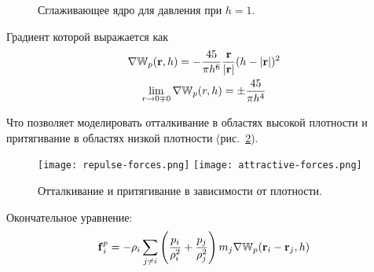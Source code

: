 \begin{figure}
  \centering
  \resizebox{.5\textwidth}{!} {
  }%
  \resizebox{.5\textwidth}{!} {
  }
  \caption{Сглаживающее ядро для давления при $h=1$.}
  \label{fig:kernel-pressure}
\end{figure}

Градиент которой выражается как
\begin{equation}
  \begin{gathered}
    \nabla\mathbb W_p(\boldsymbol{\mathbf{r}}, h)=-\frac{45}{\pi h^6}\frac{\boldsymbol{\mathbf{r}}}{|\boldsymbol{\mathbf{r}}|}(h-|\boldsymbol{\mathbf{r}}|)^2\\
    \lim_{r\to 0\mp0}\nabla\mathbb W_p(r, h)=\pm\frac{45}{\pi h^4}
  \end{gathered}
\end{equation}

Что позволяет моделировать отталкивание в областях высокой плотности и притягивание в областях низкой плотности (рис.~\ref{fig:repulse-attractive}).

\begin{figure}[h]
  \centering
  \texttt{[image: repulse-forces.png]}
  \texttt{[image: attractive-forces.png]}
  \caption{Отталкивание и притягивание в зависимости от плотности.}
  \label{fig:repulse-attractive}
\end{figure}

Окончательное уравнение:
\begin{equation} \label{eq:pressure-force}
  \boldsymbol{\mathbf{f}}_i^p=-\rho_i\sum_{j\neq i}\left(\frac{p_i}{\rho_i^2}+\frac{p_j}{\rho_j^2}\right)m_j\nabla\mathbb W_p(\boldsymbol{\mathbf{r}}_i-\boldsymbol{\mathbf{r}}_j, h)
\end{equation}


